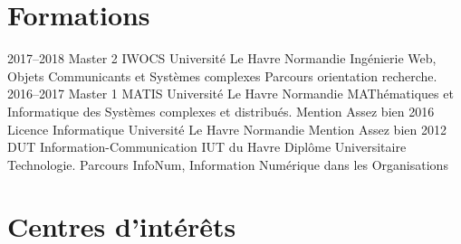 \documentclass[]{cv-style}          %
\begin{document}

\section{Formations}

\begin{entrylist}
\entry
  {2017--2018}
  {Master 2 IWOCS}
  {Université Le Havre Normandie}
  {Ingénierie Web, Objets Communicants et Systèmes complexes Parcours orientation recherche.}
\entry
  {2016--2017}
  {Master 1 MATIS}
  {Université Le Havre Normandie}
  {MAThématiques et Informatique des Systèmes complexes et distribués. Mention Assez bien}
\entry
  {2016}
  {Licence Informatique}
  {Université Le Havre Normandie}
  {Mention Assez bien}
\entry
  {2012}
  {DUT Information-Communication}
  {IUT du Havre}
  {Diplôme Universitaire Technologie. Parcours InfoNum, Information Numérique dans les Organisations}
\end{entrylist}






\section{Centres d'intérêts} 
\end{document}
